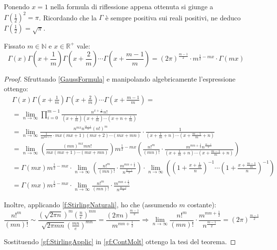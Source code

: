 \begin{remark}
	Ponendo $x=1$ nella formula di riflessione appena ottenuta si giunge a $\Gamma\left(\frac12\right)^2=\pi$. 
	Ricordando che la $\Gamma$ è sempre positiva sui reali positivi, ne deduco $\Gamma\left(\frac12\right)=\sqrt\pi$.
\end{remark}


\begin{theorem}\label{gf:Moltiplicazione}
	Fissato $m\in\mathbb{N}$ e $x\in\mathbb{R^+}$ vale:
	\begin{equation*}
		\Gamma(x)\Gamma\left(x+\frac 1m\right)\Gamma\left(x+\frac 2m\right)\cdots \Gamma\left(x+\frac {m-1}m\right)=
		(2\pi)^{\frac{m-1}2}\cdot m^{\frac12-mx}\cdot\Gamma(mx)
	\end{equation*}
\end{theorem}
\begin{proof}
	Sfruttando \cref{GaussFormula} e manipolando algebricamente l'espressione ottengo:
	\begin{equation}\begin{split}\label{gf:ContMolt}
		&\Gamma(x)\Gamma\left(x+\frac 1m\right)\Gamma\left(x+\frac 2m\right)\cdots \Gamma\left(x+\frac {m-1}m\right) =\\
		&=\lim_{n\to\infty} \prod_{i=0}^{m-1}\frac{n^{x+\frac im}n!}
		{\left(x+\frac im\right)\left(x+\frac im\right)\cdots \left(x+n+\frac im\right)}\\
		&=\lim_{n\to\infty}\frac{n^{mx}n^{\frac{m-1}2}(n!)^m}{\frac 1{m^{mn+1}}\cdot mx(mx+1)(mx+2)\cdots (mx+mn)}\cdot 
		\frac1 {\left(x+\frac 1m+n\right)\cdots \left(x+\frac {m-1}m+n\right)}\\
		&=\lim_{n\to\infty}\left(\frac{(mn)^{mx}mn!}{mx(mx+1)\cdots(mx+mn)}\right)m^{\frac12-mx}
		\left(\frac{n!^m}{(mn)!}\cdot\frac{m^{mn+\frac12}n^{\frac{m-1}2}}
		{\left(x+\frac 1m+n\right)\cdots \left(x+\frac {m-1}m+n\right)}\right)\\
		&=\Gamma(mx)m^{\frac12-mx} \cdot \lim_{n\to\infty} \left( \frac{n!^m}{(mn)!}\cdot 
		\frac{m^{mn+\frac12}}{n^{\frac{m-1}2}}\right)\cdot 
		\lim_{n\to\infty}\left( \left( 1+\frac{x+\frac{1}m}{n}\right)^{-1}
		\cdots \left( 1+\frac{x+\frac{m-1}m}{n}\right)^{-1}\right) \\
		&=\Gamma(mx)m^{\frac12-mx} \cdot \lim_{n\to\infty}\frac{n!^m}{(mn)!}\cdot \frac{m^{mn+\frac12}}{n^{\frac{m-1}2}}
	\end{split}\end{equation}
	
	Inoltre, applicando \cref{f:StirlingNaturali}, ho che (assumendo $m$ costante):
	\begin{equation}\label{gf:StirlingApplic}
		\frac{n!^m}{(mn)!}\sim\frac{\left(\sqrt{2\pi n}\right)^m\left(\frac ne\right)^{mn}}{\sqrt{2\pi mn}\left(\frac{mn}e\right)^{mn}}
		=\frac{(2\pi n)^{\frac{m-1}2}}{m^{mn+\frac12}}\Rightarrow 
		\lim_{n\to\infty}\frac{n!^m}{(mn)!}\cdot \frac{m^{mn+\frac12}}{n^{\frac{m-1}2}}=(2\pi)^{\frac{m-1}2}
	\end{equation}
	
	Sostituendo \cref{gf:StirlingApplic} in \cref{gf:ContMolt} ottengo la tesi del teorema.
\end{proof}

